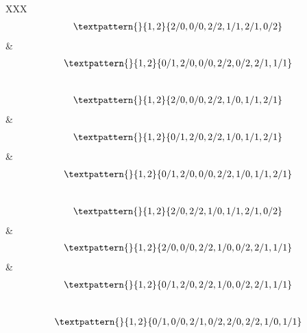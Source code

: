 \begin{center}
\begin{longtabu}[l]{XXX}
\begin{equation}
\begin{gathered}
		\textpattern{}{1,2}{2/0,0/0,2/2,1/1,2/1,0/2}
	\end{gathered}
	\label{cls:192}
\end{equation}
    &
\begin{equation}
	\begin{gathered}
		\textpattern{}{1,2}{0/1,2/0,0/0,2/2,0/2,2/1,1/1}
	\end{gathered}
	\label{cls:193}
\end{equation}
\\
\begin{equation}
	\begin{gathered}
		\textpattern{}{1,2}{2/0,0/0,2/2,1/0,1/1,2/1}
	\end{gathered}
	\label{cls:194}
\end{equation}
    &
\begin{equation}
	\begin{gathered}
		\textpattern{}{1,2}{0/1,2/0,2/2,1/0,1/1,2/1}
	\end{gathered}
	\label{cls:195}
\end{equation}
    &
\begin{equation}
	\begin{gathered}
		\textpattern{}{1,2}{0/1,2/0,0/0,2/2,1/0,1/1,2/1}
	\end{gathered}
	\label{cls:196}
\end{equation}
\\
\begin{equation}
	\begin{gathered}
		\textpattern{}{1,2}{2/0,2/2,1/0,1/1,2/1,0/2}
	\end{gathered}
	\label{cls:197}
\end{equation}
    &
\begin{equation}
	\begin{gathered}
		\textpattern{}{1,2}{2/0,0/0,2/2,1/0,0/2,2/1,1/1}
	\end{gathered}
	\label{cls:198}
\end{equation}
    &
\begin{equation}
	\begin{gathered}
		\textpattern{}{1,2}{0/1,2/0,2/2,1/0,0/2,2/1,1/1}
	\end{gathered}
	\label{cls:199}
\end{equation}
\\
\begin{equation}
	\begin{gathered}
		\textpattern{}{1,2}{0/1,0/0,2/1,0/2,2/0,2/2,1/0,1/1}
	\end{gathered}

\end{equation}
\end{longtabu}
\end{center}

